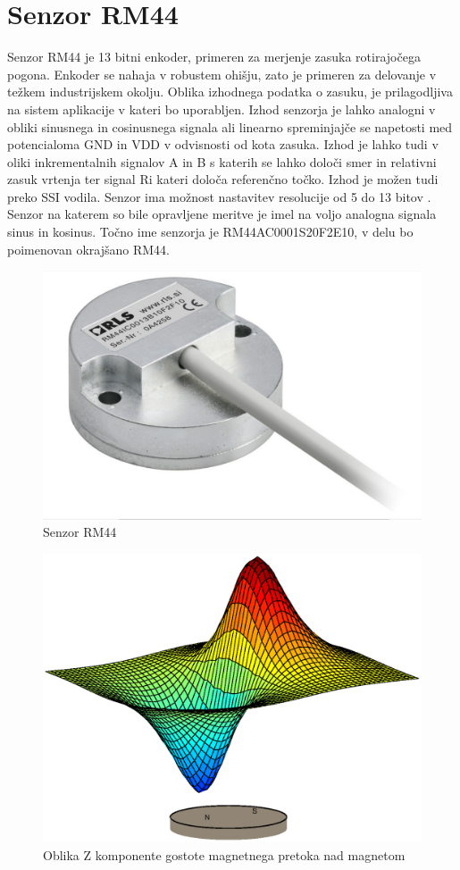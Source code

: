 






\chapter{Senzor RM44}

Senzor RM44 je 13 bitni enkoder, primeren za merjenje zasuka rotirajočega pogona\cite{RM44}.
Enkoder se nahaja v robustem ohišju, zato je primeren za delovanje v težkem industrijskem okolju. %
Oblika izhodnega podatka o zasuku, je prilagodljiva na sistem aplikacije v kateri bo uporabljen\cite{Ambrozic}. Izhod senzorja je lahko analogni v obliki sinusnega in cosinusnega signala ali linearno spreminjajče se napetosti med potencialoma GND in VDD v odvisnosti od kota zasuka.
Izhod je lahko tudi v oliki inkrementalnih signalov A in B s katerih se lahko določi smer in relativni zasuk vrtenja ter signal Ri kateri določa referenčno točko. Izhod je možen tudi preko SSI vodila. Senzor ima možnost nastavitev resolucije od 5 do 13 bitov \cite{AM8192}\cite{RM44}. Senzor na katerem so bile opravljene meritve je imel na voljo analogna signala sinus in kosinus. Točno ime senzorja je RM44AC0001S20F2E10, v delu bo poimenovan okrajšano RM44.
\begin{figure}[h]
	\centering
	\includegraphics[width=0.4\columnwidth]{./Slike/senzorRM44.jpg}
	\caption{Senzor RM44}
	\label{RM44}
\end{figure}
\begin{figure}[h]
	\centering
	\includegraphics[width=0.5\columnwidth]{./Slike/polje_brez_ravnine.eps}
	\caption{Oblika Z komponente gostote magnetnega pretoka nad magnetom}
	\label{polje_brez_ravnine}
\end{figure}
